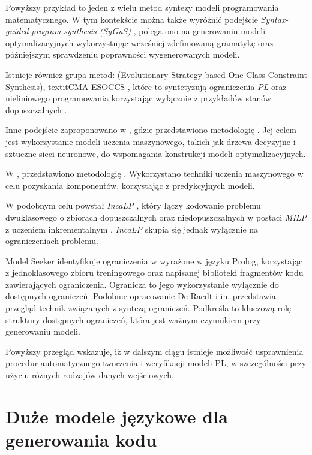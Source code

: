 Powyższy przykład to jeden z wielu metod syntezy modeli programowania matematycznego. W tym kontekście można także wyróżnić podejście \textit{Syntax-guided program synthesis (SyGuS)} \cite{6679385}, polega ono na generowaniu modeli optymalizacyjnych wykorzystując wcześniej zdefiniowaną gramatykę oraz późniejszym sprawdzeniu poprawności wygenerowanych modeli.

Istnieje również grupa metod:  (Evolutionary Strategy-based One Class Constraint Synthesis)\cite{PAWLAK2019335}, textit{CMA-ESOCCS} \cite{10.1145/3377930.3389807}, które to syntetyzują ograniczenia \textit{PL} oraz nieliniowego programowania  korzystając wyłącznie z przykładów stanów dopuszczalnych .

Inne podejście zaproponowano w \cite{LOMBARDI2017343}, gdzie przedstawiono metodologię . Jej celem jest wykorzystanie modeli uczenia maszynowego, takich jak drzewa decyzyjne i sztuczne sieci neuronowe, do wspomagania konstrukcji modeli optymalizacyjnych.

W \cite{LOMBARDI2017343}, przedstawiono metodologię . Wykorzystano techniki uczenia maszynowego  w celu pozyskania komponentów, korzystając z predykcyjnych modeli.

W podobnym celu powstał \textit{IncaLP} \cite{8995380}, który łączy kodowanie problemu dwuklasowego o zbiorach dopuszczalnych oraz niedopuszczalnych w postaci \textit{MILP} z uczeniem inkrementalnym . \textit{IncaLP} skupia się jednak wyłącznie na ograniczeniach problemu.

Model Seeker \cite{10.1007/978-3-642-33558-7_13} identyfikuje ograniczenia w  wyrażone w języku Prolog, korzystając z jednoklasowego zbioru treningowego oraz napisanej biblioteki fragmentów kodu zawierających ograniczenia. Ogranicza to jego wykorzystanie wyłącznie do dostępnych ograniczeń. Podobnie opracowanie De Raedt i in. \cite{de2018learning} przedstawia przegląd technik związanych z syntezą ograniczeń. Podkreśla to kluczową rolę struktury dostępnych ograniczeń, która jest ważnym czynnikiem przy generowaniu modeli.

Powyższy przegląd wskazuje, iż w dalszym ciągu istnieje możliwość usprawnienia procedur automatycznego tworzenia i weryfikacji modeli PL, w szczególności przy użyciu różnych rodzajów danych wejściowych.

\section{Duże modele językowe dla generowania kodu}

